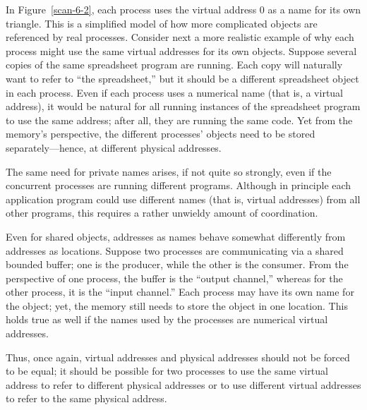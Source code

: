 In Figure~\ref{scan-6-2}, each process uses the virtual address 0 as a
name for its own triangle.  This is a simplified model of how more complicated
objects are referenced by real processes.
Consider next a more realistic example of why each process might use the same
virtual addresses for its own objects.  Suppose several copies of the
same spreadsheet program are running.  Each copy will naturally want
to refer to ``the spreadsheet,'' but it should be a different
spreadsheet object in each process.  Even if each process uses a numerical name
(that is, a virtual address), it would be natural for all running instances of
the spreadsheet program to use the same address; after all, they are
running the same code.  Yet from the memory's perspective, the
different processes' objects need to be stored separately---hence, at
different physical addresses.

The same need for private names arises, if not quite so strongly, even
if the concurrent processes are running different programs.  Although in
principle each application program could use different names (that is,
virtual addresses) from all other programs, this requires a rather unwieldy
amount of coordination.

Even for shared objects, addresses as names behave somewhat
differently from addresses as locations.  Suppose two processes are
communicating via a shared bounded buffer; one is the producer, while
the other is the consumer.  From the perspective of one process, the
buffer is the ``output channel,'' whereas for the other process, it is
the ``input channel.''  Each process may have its own name for the
object; yet, the memory still needs to store the object in one location.
This holds true as well if the names used by the processes are numerical
virtual addresses.

Thus, once again, virtual addresses and physical
addresses should not be forced to be equal; it should be possible for
two processes to use the same virtual address to refer to different
physical addresses or to use different virtual addresses to refer to the
same physical address.

